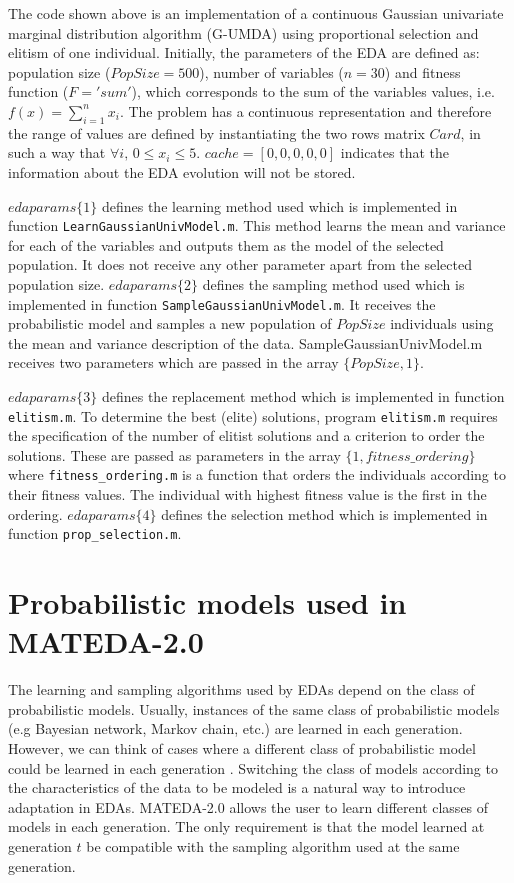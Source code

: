 \documentclass[a4paper]{article}
\begin{document}
The code shown above is an implementation of a continuous Gaussian univariate
marginal distribution algorithm (G-UMDA)
\cite{Larranhaga_et_al:2000,Larranhaga_et_al:1999} using
proportional selection and elitism of one individual. Initially, the
parameters of the EDA are defined as: population size
($PopSize = 500$), number of variables ($n=30$) and fitness function ($F = 'sum'$), which corresponds to the sum of the
variables values, i.e. $f(x) = \sum_{i=1}^n x_i$. The problem has a
continuous representation and therefore the range of values are defined
by instantiating the two rows matrix $Card$, in such a way that
$\forall i, \, 0 \leq x_i \leq 5$. $cache  = [0,0,0,0,0]$ indicates
that the information about the EDA evolution will not be stored.

$edaparams\{1\}$ defines the learning method used which is
implemented in function \texttt{LearnGaussianUnivModel.m}. This
method learns the mean and variance for each of the variables and
outputs them as the model of the selected population. It does not
receive any other parameter apart from the selected population size.
$edaparams\{2\}$ defines the sampling method used which is
implemented in function \texttt{SampleGaussianUnivModel.m}. It
receives the probabilistic model and samples a new population of
$PopSize$ individuals using the mean and variance description of the
data. SampleGaussianUnivModel.m receives two parameters which are
passed in the array $\{PopSize,1\}$.


$edaparams\{3\}$ defines the replacement method which is implemented
in function \texttt{elitism.m}. To determine the best (elite)
solutions, program \texttt{elitism.m} requires the specification of
the number of elitist solutions and a criterion to order the
solutions. These are passed as parameters in the array
$\{1,fitness\_ordering\}$ where \texttt{fitness\_ordering.m}
is a function that orders the individuals according to their fitness
values. The individual with highest fitness value is the first in the ordering. $edaparams\{4\}$ defines the selection method which is
implemented in function \texttt{prop\_selection.m}.


\section{Probabilistic models used in MATEDA-2.0}
\label{sec:PROBMODEL}

The learning and sampling algorithms used by EDAs depend on the
class of probabilistic models. Usually, instances of the same class
of probabilistic models (e.g Bayesian network, Markov chain, etc.)
are learned in each generation. However, we can think of cases where
a different class of probabilistic model could be learned in each
generation \cite{Santana_et_al:2008c}. Switching the class of models
according to the characteristics of the data to be modeled is a
natural way to introduce adaptation in EDAs. MATEDA-2.0 allows the
user to learn different classes of models in each generation. The
only requirement is that the model learned at generation $t$ be
compatible with the sampling algorithm used at the same generation.
\end{document}
